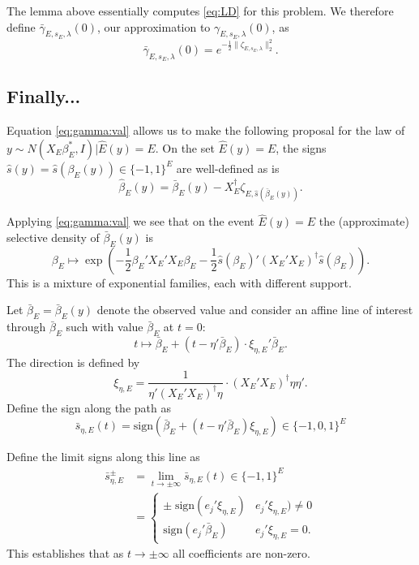\documentclass{article}
\newcommand{\OLS}{\bar{\beta}}
\newcommand{\REG}{\hat{\beta}}
\begin{document}
        The lemma above essentially computes \eqref{eq:LD} for this
        problem.  We therefore define $\bar{\gamma}_{E,s_E,\lambda}(0)$, our
        approximation to $\gamma_{E,s_E,\lambda}(0)$, as
        \begin{equation}
          \label{eq:gamma:val}
          \bar{\gamma}_{E,s_E,\lambda}(0) =
          e^{-\frac{1}{2}\|\zeta_{E,s_E,\lambda}\|^2_2}.
          \end{equation}

        \subsection{Finally...}

        Equation \eqref{eq:gamma:val} allows us to make the following proposal for the
        law of $y \sim N(X_E\beta_E^*, I) | \hat{E}(y)=E$. On the set
        $\hat{E}(y)=E$, the signs $\hat{s}(y) = \hat{s}(\beta_E(y)) \in \{-1,1\}^E$ are well-defined as is
        $$
        \REG_E(y) = \OLS_E(y) - X_E^{\dagger}\zeta_{E,\hat{s}(\OLS_E(y))}.
        $$

        Applying \eqref{eq:gamma:val} we see that on
        the event $\hat{E}(y)=E$ the (approximate) selective density of
        $\OLS_E(y)$ is
        \begin{equation}
          \label{eq:proposal}
          \beta_E \mapsto \exp\left(-\frac{1}{2} \beta_E'X_E'X_E\beta_E - \frac{1}{2}\hat{s}(\beta_E)'(X_E'X_E)^{\dagger}\hat{s}(\beta_E)\right).
          \end{equation}
        This is a mixture of exponential families, each with different support. 

        Let $\OLS_E=\OLS_E(y)$ denote the observed value and consider an affine line of interest through
        $\OLS_E$ such with value $\OLS_E$ at $t=0$:
        $$t \mapsto \OLS_E + (t- \eta'\OLS_E) \cdot \xi_{\eta,E}' \OLS_E.$$
        The direction is defined by $$
        \xi_{\eta,E} = \frac{1}{\eta'(X_E'X_E)^{\dagger}\eta} \cdot (X_E'X_E)^{\dagger} \eta \eta'.
        $$ 
        Define the sign along the path as
        $$
        \bar{s}_{\eta,E}(t) = \textrm{sign}\left( \OLS_E + (t - \eta'\OLS_E) \xi_{\eta,E} \right)
        \in \{-1,0,1\}^E
        $$

        Define the limit signs along this line as
        $$
        \begin{aligned}
          \bar{s}^{\pm}_{\eta, E} &= \lim_{t \to \pm \infty} \bar{s}_{\eta, E}(t)  \in \{-1,1\}^E \\
          &= \begin{cases}
            \pm \; \text{sign} (e_j'\xi_{\eta,E}) & e_j'\xi_{\eta,E}) \neq 0 \\
            \text{sign}(e_j'\OLS_{E}) & e_j'\xi_{\eta,E}=0.
            \end{cases}
        \end{aligned}
        $$
        This establishes that as $t \to \pm \infty$ all coefficients are non-zero.
\end{document}
